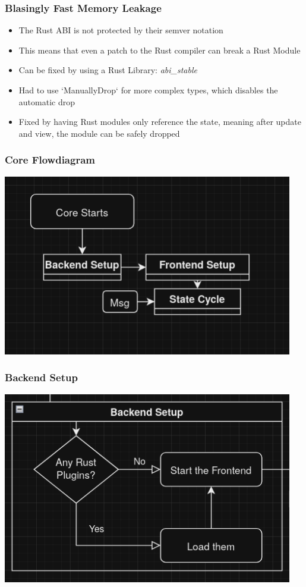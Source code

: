 \documentclass{beamer}
\begin{document}
\begin{frame}
  \frametitle{Blasingly Fast Memory Leakage }
  \begin{itemize}
    \item The Rust ABI is not protected by their semver notation
    \item This means that even a patch to the Rust compiler can break a
      Rust Module
    \item Can be fixed by using a Rust Library: \textit{abi\_stable}
    \item Had to use `ManuallyDrop` for more complex types, which disables
      the automatic drop
    \item Fixed by having Rust modules only reference the state, meaning
      after update and view, the module can be safely dropped
  \end{itemize}
\end{frame}

\hidelogo
\begin{frame}
  \frametitle{Core Flowdiagram}
  \centering
  \includegraphics[width=0.95\textwidth]{../../pics/mini-core-cycle.png}
\end{frame}

\begin{frame}
  \frametitle{Backend Setup}
  \centering
  \includegraphics[width=0.95\textwidth]{../../pics/backend-setup.png}
\end{frame}
\end{document}
